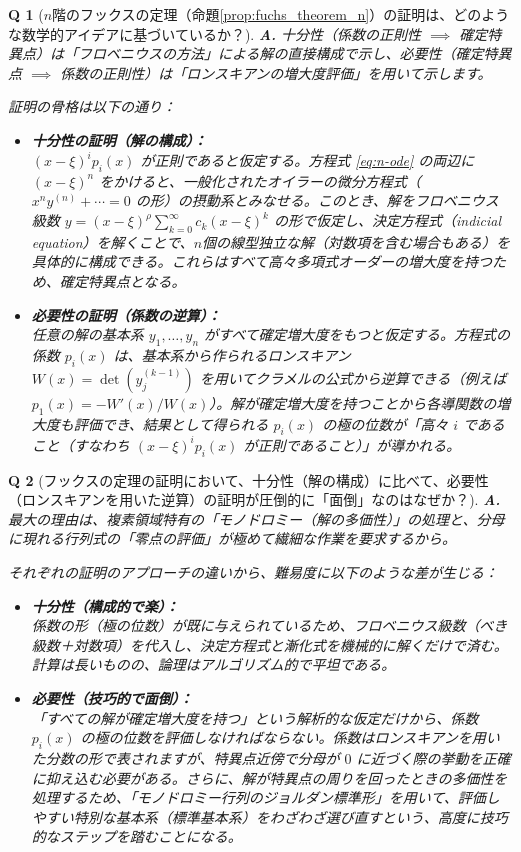 \documentclass[paper=a4, fontsize=11pt]{jlreq} %
\theoremstyle{break}
\theoremstyle{qa}
\newtheorem*{Q}{Q}
\theoremstyle{remark} %
\begin{document}
\begin{Q}[$n$階のフックスの定理（命題\ref{prop:fuchs_theorem_n}）の証明は、どのような数学的アイデアに基づいているか？]
\textbf{A.} 十分性（係数の正則性 $\implies$ 確定特異点）は「フロベニウスの方法」による解の直接構成で示し、必要性（確定特異点 $\implies$ 係数の正則性）は「ロンスキアンの増大度評価」を用いて示します。

証明の骨格は以下の通り：
\begin{itemize}
    \item \textbf{十分性の証明（解の構成）：}\\
    $(x-\xi)^{i}p_{i}(x)$ が正則であると仮定する。方程式 \eqref{eq:n-ode} の両辺に $(x-\xi)^n$ をかけると、一般化されたオイラーの微分方程式（$x^n y^{(n)} + \cdots = 0$ の形）の摂動系とみなせる。このとき、解をフロベニウス級数 $y = (x-\xi)^{\rho} \sum_{k=0}^{\infty} c_k (x-\xi)^k$ の形で仮定し、決定方程式（indicial equation）を解くことで、$n$個の線型独立な解（対数項を含む場合もある）を具体的に構成できる。これらはすべて高々多項式オーダーの増大度を持つため、確定特異点となる。

    \item \textbf{必要性の証明（係数の逆算）：}\\
    任意の解の基本系 $y_1, \dots, y_n$ がすべて確定増大度をもつと仮定する。方程式の係数 $p_i(x)$ は、基本系から作られるロンスキアン $W(x) = \det(y_j^{(k-1)})$ を用いてクラメルの公式から逆算できる（例えば $p_1(x) = -W'(x)/W(x)$）。解が確定増大度を持つことから各導関数の増大度も評価でき、結果として得られる $p_i(x)$ の極の位数が「高々 $i$ であること（すなわち $(x-\xi)^i p_i(x)$ が正則であること）」が導かれる。
\end{itemize}
\end{Q}

\begin{Q}[フックスの定理の証明において、十分性（解の構成）に比べて、必要性（ロンスキアンを用いた逆算）の証明が圧倒的に「面倒」なのはなぜか？]
\textbf{A.} 最大の理由は、複素領域特有の「モノドロミー（解の多価性）」の処理と、分母に現れる行列式の「零点の評価」が極めて繊細な作業を要求するから。

それぞれの証明のアプローチの違いから、難易度に以下のような差が生じる：
\begin{itemize}
    \item \textbf{十分性（構成的で楽）：}\\
    係数の形（極の位数）が既に与えられているため、フロベニウス級数（べき級数＋対数項）を代入し、決定方程式と漸化式を機械的に解くだけで済む。計算は長いものの、論理はアルゴリズム的で平坦である。
    
    \item \textbf{必要性（技巧的で面倒）：}\\
    「すべての解が確定増大度を持つ」という解析的な仮定だけから、係数 $p_i(x)$ の極の位数を評価しなければならない。係数はロンスキアンを用いた分数の形で表されますが、特異点近傍で分母が $0$ に近づく際の挙動を正確に抑え込む必要がある。さらに、解が特異点の周りを回ったときの多価性を処理するため、「モノドロミー行列のジョルダン標準形」を用いて、評価しやすい特別な基本系（標準基本系）をわざわざ選び直すという、高度に技巧的なステップを踏むことになる。
\end{itemize}
\end{Q}
\end{document}
